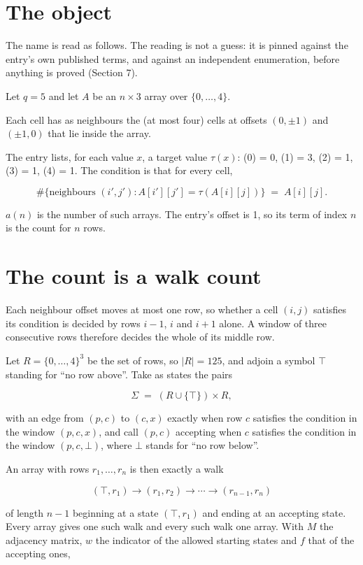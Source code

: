 \documentclass[11pt]{article}
\theoremstyle{definition}
\begin{document}
\section{The object}

The name is read as follows. The reading is not a guess: it is pinned against the entry's own published terms, and against an independent enumeration, before anything is proved (Section 7).

Let $q = 5$ and let $A$ be an $n \times 3$ array over $\{0,\dots,4\}$.

Each cell has as neighbours the (at most four) cells at offsets $(0,\pm1)$ and $(\pm1,0)$ that lie inside the array.

The entry lists, for each value $x$, a target value $\tau(x)$: \tau(0) = 0, \tau(1) = 3, \tau(2) = 1, \tau(3) = 1, \tau(4) = 1. The condition is that for every cell,

\[\#\{\text{neighbours } (i',j') : A[i'][j'] = \tau(A[i][j])\} \;=\; A[i][j].\]

$a(n)$ is the number of such arrays. The entry's offset is 1, so its term of index $n$ is the count for $n$ rows.

\section{The count is a walk count}

Each neighbour offset moves at most one row, so whether a cell $(i,j)$ satisfies its condition is decided by rows $i-1$, $i$ and $i+1$ alone. A window of three consecutive rows therefore decides the whole of its middle row.

Let $R = \{0,\dots,4\}^{3}$ be the set of rows, so $|R| = 125$, and adjoin a symbol $\top$ standing for ``no row above''. Take as states the pairs

\[\Sigma \;=\; (R \cup \{\top\}) \times R,\]

with an edge from $(p,c)$ to $(c,x)$ exactly when row $c$ satisfies the condition in the window $(p,c,x)$, and call $(p,c)$ accepting when $c$ satisfies the condition in the window $(p,c,\bot)$, where $\bot$ stands for ``no row below''.

An array with rows $r_1,\dots,r_n$ is then exactly a walk

\[(\top,r_1) \to (r_1,r_2) \to \cdots \to (r_{n-1},r_n)\]

of length $n-1$ beginning at a state $(\top,r_1)$ and ending at an accepting state. Every array gives one such walk and every such walk one array. With $M$ the adjacency matrix, $w$ the indicator of the allowed starting states and $f$ that of the accepting ones,
\end{document}
